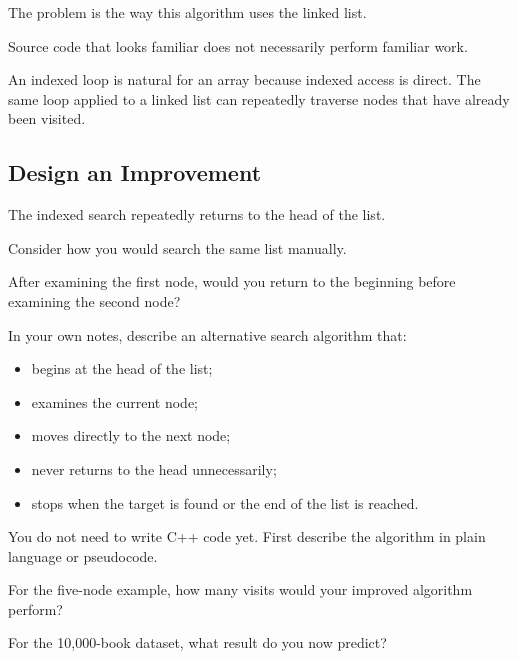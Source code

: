 \documentclass{csc2059practical}
\begin{document}
The problem is the way this algorithm uses the linked list.

\begin{importantnote}
Source code that looks familiar does not necessarily perform familiar work.

An indexed loop is natural for an array because indexed access is direct. The
same loop applied to a linked list can repeatedly traverse nodes that have
already been visited.
\end{importantnote}


\subsection{Design an Improvement}

The indexed search repeatedly returns to the head of the list.

Consider how you would search the same list manually.

After examining the first node, would you return to the beginning before
examining the second node?

In your own notes, describe an alternative search algorithm that:

\begin{itemize}
    \item begins at the head of the list;
    \item examines the current node;
    \item moves directly to the next node;
    \item never returns to the head unnecessarily;
    \item stops when the target is found or the end of the list is reached.
\end{itemize}

You do not need to write C++ code yet. First describe the algorithm in plain
language or pseudocode.

\begin{reflectionbox}
For the five-node example, how many visits would your improved algorithm
perform?

For the 10,000-book dataset, what result do you now predict?
\end{reflectionbox}

\end{document}
